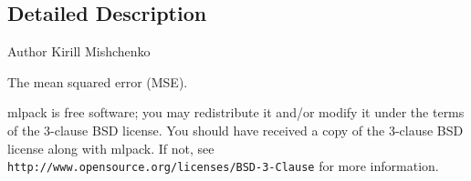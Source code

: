 \subsection{Detailed Description}
\begin{DoxyAuthor}{Author}
Kirill Mishchenko
\end{DoxyAuthor}
The mean squared error (M\+SE).

mlpack is free software; you may redistribute it and/or modify it under the terms of the 3-\/clause B\+SD license. You should have received a copy of the 3-\/clause B\+SD license along with mlpack. If not, see {\tt http\+://www.\+opensource.\+org/licenses/\+B\+S\+D-\/3-\/\+Clause} for more information. 